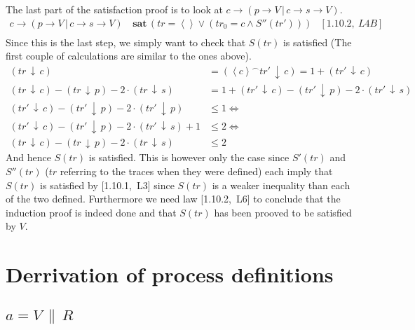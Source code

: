 \documentclass[11pt,a4paper]{article}
\def\ra{\rightarrow}
\def\cc{\,\|\,}
\def\ch{\,|\,}
\def\cat{^{\frown}}
\def\count{\,\downarrow\,}
\def\sat{\,\textbf{sat}\,}
\newcommand{\ab}[1]{\left \langle #1 \right \rangle}
\begin{document}
The last part of the satisfaction proof is to look at $c \ra (p \ra V \ch c \ra
s \ra V)$.
\begin{align*}
    c \ra (p \ra V \ch c \ra s \ra V) &\sat (
        tr = \ab{ } \lor
        (tr_0 = c \land S''(tr'))
        ) & [1.10.2,~L4B] \\
\end{align*}
Since this is the last step, we simply want to check that $S(tr)$ is satisfied
(The first couple of calculations are similar to the ones above).
\begin{align*}
    (tr \count c) &= (\ab{c} \cat tr' \count c) = 1 + (tr' \count c) \\
    (tr \count c) - (tr \count p) - 2 \cdot (tr \count s) &=
        1 + (tr' \count c) - (tr' \count p) - 2 \cdot (tr' \count s) \\
    (tr' \count c) - (tr' \count p) - 2 \cdot (tr' \count p) &\leq 1
    \Leftrightarrow \\
    (tr' \count c) - (tr' \count p) - 2 \cdot (tr' \count s) +1 & \leq 2
    \Leftrightarrow \\
    (tr \count c) - (tr \count p) - 2 \cdot (tr \count s) & \leq 2
\end{align*}
And hence $S(tr)$ is satisfied. This is however only the case since $S'(tr)$ and
$S''(tr)$ ($tr$ referring to the traces when they were defined) each imply that
$S(tr)$ is satisfied by [1.10.1,~L3] since $S(tr)$ is a weaker inequality than
each of the two defined. Furthermore we need law [1.10.2,~L6] to conclude that
the induction proof is indeed done and that $S(tr)$ has been prooved to be
satisfied by $V$.

\section{Derrivation of process definitions}
\subsection{$a = V \cc R$}
\end{document}
